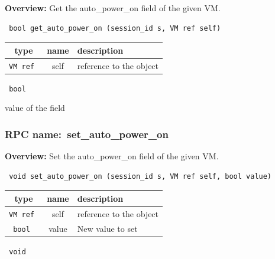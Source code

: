 {\bf Overview:} 
Get the auto\_power\_on field of the given VM.

\begin{verbatim} bool get_auto_power_on (session_id s, VM ref self)\end{verbatim}



 
\vspace{0.3cm}
\begin{tabular}{|c|c|p{7cm}|}
 \hline
{\bf type} & {\bf name} & {\bf description} \\ \hline
{\tt VM ref } & self & reference to the object \\ \hline 

\end{tabular}

\vspace{0.3cm}

{\tt 
bool
}


value of the field
\vspace{0.3cm}
\vspace{0.3cm}
\vspace{0.3cm}
\subsubsection{RPC name:~set\_auto\_power\_on}

{\bf Overview:} 
Set the auto\_power\_on field of the given VM.

\begin{verbatim} void set_auto_power_on (session_id s, VM ref self, bool value)\end{verbatim}



 
\vspace{0.3cm}
\begin{tabular}{|c|c|p{7cm}|}
 \hline
{\bf type} & {\bf name} & {\bf description} \\ \hline
{\tt VM ref } & self & reference to the object \\ \hline 

{\tt bool } & value & New value to set \\ \hline 

\end{tabular}

\vspace{0.3cm}

{\tt 
void
}



